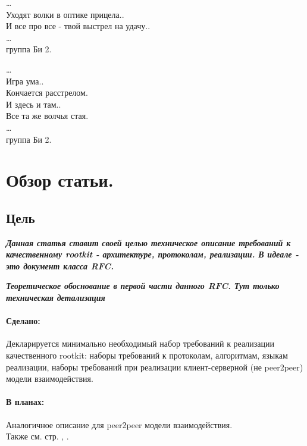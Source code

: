 \begin{flushleft}
\ldots\\
Уходят волки в оптике прицела..\\
И все про все - твой выстрел на удачу..\\
\ldots\\
группа Би 2.\\
\end{flushleft}

\begin{flushright}
\ldots\\
Игра ума.. \\
Кончается расстрелом.\\
И здесь и там..\\
Все та же волчья стая.\\
\ldots\\
группа Би 2.\\
\end{flushright}


\section{Обзор статьи.}
\label{section_paper_overview}


\subsection{Цель}
%
%
{\sl\bf
 Данная статья ставит своей целью техническое описание требований к качественному
 rootkit - архитектуре, протоколам, реализации. В идеале - это документ класса RFC.
}

{\sl\bf
Теоретическое обоснование в первой части данного RFC. Тут только техническая детализация
}


\paragraph{Сделано:\\}
Декларируется минимально необходимый набор требований к
реализации качественного rootkit: наборы требований к протоколам,
алгоритмам, языкам реализации, наборы требований при реализации
клиент-серверной (не peer2peer) модели взаимодействия.

\paragraph{В планах:\\}
Аналогичное описание для peer2peer модели взаимодействия.\\
Также см. стр. \pageref{paper_2do_1}, \pageref{paper_2do_2} .



